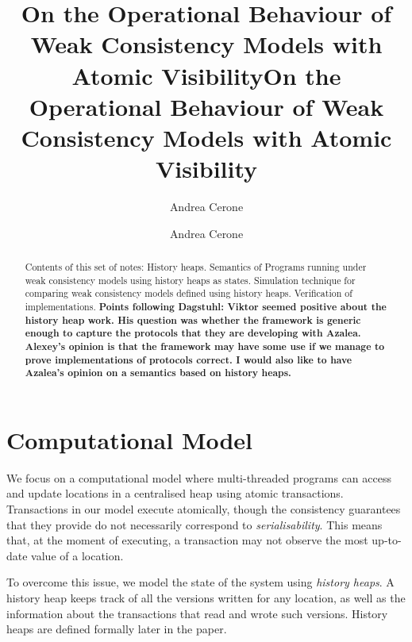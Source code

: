 \documentclass[a4paper,UKenglish]{article}%
\title{On the Operational Behaviour of Weak Consistency Models with Atomic Visibility}
\title{On the Operational Behaviour of Weak Consistency Models with Atomic Visibility}
\author[1]{Andrea Cerone}
\affil[1]{Imperial College London, UK}
\author[1]{Andrea Cerone}
\affil[1]{Imperial College London, UK, \texttt{a.cerone@imperial.ac.uk}}
\theoremstyle{plain}
\begin{document}
\maketitle
\begin{abstract}
Contents of this set of notes: 
History heaps. Semantics of Programs 
running under weak consistency models using history heaps as states. 
Simulation technique for comparing weak consistency models defined using 
history heaps. Verification of implementations.
\textbf{Points following Dagstuhl: Viktor seemed positive about the 
history heap work. His question was whether the framework is generic 
enough to capture the protocols that they are developing with Azalea. 
Alexey's opinion is that the framework may have some use if we 
manage to prove implementations of protocols correct. 
I would also like to have Azalea's opinion on a semantics based 
on history heaps.}

\end{abstract}

\section{Computational Model}
We focus on a computational model where multi-threaded programs can access and update 
locations in a centralised heap using atomic transactions. Transactions in our model execute atomically, 
though the consistency guarantees that they provide do not necessarily correspond to \emph{serialisability}. 
This means that, at the moment of executing, a transaction may not observe the most up-to-date value 
of a location. 

To overcome this issue, we model the state of the system using \emph{history heaps}. A 
history heap keeps track of all the versions written for any location, as well as the information 
about the transactions that read and wrote such versions. History heaps are defined formally later in 
the paper.
\end{document}
